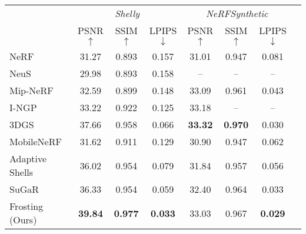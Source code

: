 \begin{table}
   \caption{
   }
  \label{tab:nvsmetrics_shelly}
  \centering
  {\scriptsize
  \begin{tabular}{@{}lccccccc@{}}
    \toprule
     \multicolumn{1}{c}{} & \multicolumn{3}{c}{\emph{Shelly}} & \multicolumn{3}{c}{\emph{NeRFSynthetic}} \\
     \cmidrule(r){2-4} \cmidrule(r){5-7}
      & PSNR $\uparrow$ & SSIM $\uparrow$ & LPIPS $\downarrow$ & PSNR $\uparrow$ & SSIM $\uparrow$ & LPIPS $\downarrow$ & \\
    \midrule
    NeRF~\cite{mildenhall2020nerf} & 31.27 & 0.893 & 0.157 & 31.01 & 0.947 & 0.081 & \\
    NeuS~\cite{wang2021neus} & 29.98 & 0.893 & 0.158 & -- & -- & -- & \\
    Mip-NeRF~\cite{barron2021mipnerf}  & 32.59 & 0.899 & 0.148 & \cellcolor{yellow!25}33.09 & 0.961 & 0.043 & \\
    I-NGP~\cite{mueller2022instantngp} & 33.22 & 0.922 & 0.125 & \cellcolor{orange!25}33.18 & -- & -- & \\
    3DGS~\cite{kerbl3Dgaussians}  & \cellcolor{orange!25}37.66 & \cellcolor{orange!25}0.958 & \cellcolor{orange!25}0.066 & \cellcolor{red!25}\textbf{33.32} & \cellcolor{red!25}\textbf{0.970} & \cellcolor{orange!25}0.030 & \\
    \midrule
    MobileNeRF~\cite{chen2022mobilenerf} & 31.62 & 0.911 & 0.129 & 30.90 & 0.947 & 0.062 & \\
    Adaptive Shells~\cite{wang-siggraphasia2023-adaptive-shells}  & 36.02 & \cellcolor{yellow!25}0.954 & 0.079 & 31.84 & 0.957 & 0.056 & \\
    SuGaR\cite{guedon2023sugar}  & \cellcolor{yellow!25}36.33 & \cellcolor{yellow!25}0.954 & \cellcolor{yellow!25}0.059 & 32.40 & \cellcolor{yellow!25}0.964 & \cellcolor{yellow!25}0.033 & \\
    Frosting (Ours)  & \cellcolor{red!25}\textbf{39.84} & \cellcolor{red!25}\textbf{0.977} & \cellcolor{red!25}\textbf{0.033} & 33.03 & \cellcolor{orange!25}0.967 & \cellcolor{red!25}\textbf{0.029} & \\
    \bottomrule
  \end{tabular}
  }
\end{table}